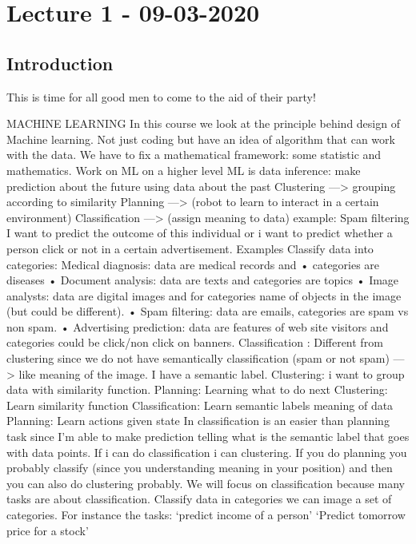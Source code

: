 \documentclass[../main.tex]{subfiles}
\begin{document}
\section{Lecture 1 - 09-03-2020}

\subsection{Introduction}
This is time for all good men to come to the aid of their party!

MACHINE LEARNING
In this course we look at the principle behind design of Machine learning.
Not just coding but have an idea of algorithm that can work with the data.
We have to fix a mathematical framework: some statistic and mathematics.
Work on ML on a higher level
ML is data inference: make prediction about the future using data about the
past
Clustering —> grouping according to similarity
Planning —> (robot to learn to interact in a certain environment)
Classification —> (assign meaning to data) example: Spam filtering
I want to predict the outcome of this individual or i want to predict whether a
person click or not in a certain advertisement.
Examples
Classify data into categories:
Medical diagnosis: data are medical records and • categories are diseases
• Document analysis: data are texts and categories are topics
• Image analysts: data are digital images and for categories name of objects
in the image (but could be different).
• Spam filtering: data are emails, categories are spam vs non spam.
• Advertising prediction: data are features of web site visitors and categories
could be click/non click on banners.
Classification : Different from clustering since we do not have semantically
classification (spam or not spam) —> like meaning of the image.
I have a semantic label.
Clustering: i want to group data with similarity function.
Planning: Learning what to do next
Clustering: Learn similarity function
Classification: Learn semantic labels meaning of data
Planning: Learn actions given state
In classification is an easier than planning task since I’m able to make
prediction telling what is the semantic label that goes with data points.
If i can do classification i can clustering.
If you do planning you probably classify (since you understanding meaning in
your position) and then you can also do clustering probably.
We will focus on classification because many tasks are about classification.
Classify data in categories we can image a set of categories.
For instance the tasks:
‘predict income of a person’
‘Predict tomorrow price for a stock’
\end{document}
